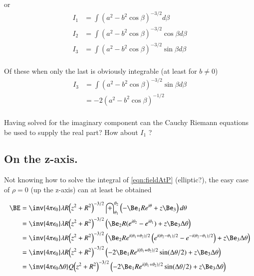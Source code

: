 \documentclass{article}
\begin{document}
or
\begin{align*}
I_1 &= \int { \left(a^2 - b^2\cos\beta\right) }^{-3/2} d\beta \\
I_2 &= \int { \left(a^2 - b^2\cos\beta\right) }^{-3/2} \cos\beta d\beta \\
I_3 &= \int { \left(a^2 - b^2\cos\beta\right) }^{-3/2} \sin\beta d\beta \\
\end{align*}

Of these when only the last is obviously integrable (at least for $b \ne 0$)
\begin{align*}
I_3
&= \int { \left(a^2 - b^2\cos\beta\right) }^{-3/2} \sin\beta d\beta \\
&= -2 {\left(a^2 - b^2\cos\beta\right) }^{-1/2} \\
\end{align*}

Having solved for the imaginary component can the Cauchy Riemann equations be used to supply the real part?  How about $I_1$ ?

\subsection{ On the z-axis. }

Not knowing how to solve the integral of \ref{eqn:fieldAtP} (elliptic?), the easy case
of $\rho = 0$ (up the z-axis) can at least be obtained

\begin{align*}
\BE 
&= \inv{4 \pi \epsilon_0} \lambda R { \left(z^2 + R^2\right) }^{-3/2}
\int_{\theta_1}^{\theta_2} \left(-\Be_1 R e^{i\theta} + z \Be_3\right) d\theta \\
&= \inv{4 \pi \epsilon_0} \lambda R { \left(z^2 + R^2\right) }^{-3/2}
\left(\Be_2 R (e^{i\theta_2} -e^{i\theta_1}) + z \Be_3 \Delta\theta \right) \\
&= \inv{4 \pi \epsilon_0} \lambda R { \left(z^2 + R^2\right) }^{-3/2}
\left(\Be_2 R e^{i(\theta_1 + \theta_2)/2} \left(
e^{i(\theta_2 - \theta_1)/2}
-e^{-i(\theta_2 - \theta_1)/2}
\right) + z \Be_3 \Delta\theta \right) \\
&= \inv{4 \pi \epsilon_0} \lambda R { \left(z^2 + R^2\right) }^{-3/2}
\left(-2 \Be_1 R e^{i(\theta_1 + \theta_2)/2} \sin(\Delta\theta/2)
+ z \Be_3 \Delta\theta \right) \\
&= \inv{4 \pi \epsilon_0 \Delta\theta} Q { \left(z^2 + R^2\right) }^{-3/2}
\left(-2 \Be_1 R e^{i(\theta_1 + \theta_2)/2} \sin(\Delta\theta/2)
+ z \Be_3 \Delta\theta \right) \\
\end{align*}
\end{document}
